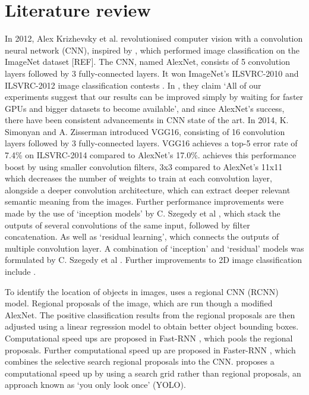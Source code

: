 \documentclass[11pt]{article}
\begin{document}
\section{Literature review}
In 2012, Alex Krizhevsky et al. revolutionised computer vision with a convolution neural network (CNN), inspired by \cite{Yann}, which performed image classification on the ImageNet dataset [REF]. The CNN, named AlexNet, consists of 5 convolution layers followed by 3 fully-connected layers. It won ImageNet's ILSVRC-2010 and ILSVRC-2012 image classification contests \cite{alex_net}. In \cite{alex_net}, they claim `All of our experiments suggest that our results can be improved simply by waiting for faster GPUs and bigger datasets to become available', and since AlexNet's success, there have been consistent advancements in CNN state of the art. In 2014, K. Simonyan and A. Zisserman introduced VGG16\cite{VGG16}, consisting of 16 convolution layers followed by 3 fully-connected layers. VGG16 achieves a top-5 error rate of 7.4\% on ILSVRC-2014 compared to AlexNet's 17.0\%. \cite{VGG16} achieves this performance boost by using smaller convolution filters, 3x3 compared to AlexNet's 11x11 which decreases the number of weights to train at each convolution layer, alongside a deeper convolution architecture, which can extract deeper relevant semantic meaning from the images. Further performance improvements were made by the use of `inception models' by C. Szegedy et al \cite{inception}\cite{inceptionV2}, which stack the outputs of several convolutions of the same input, followed by filter concatenation. As well as `residual learning'\cite{ResNet}, which connects the outputs of multiple convolution layer. A combination of `inception' and `residual' models was formulated by C. Szegedy et al \cite{Incep_ResNet}. Further improvements to 2D image classification include \cite{neural_search} \cite{scaleable_image}.

To identify the location of objects in images, \cite{RNN} uses a regional CNN (RCNN) model. Regional proposals of the image, which are run though a modified AlexNet. The positive classification results from the regional proposals are then adjusted using a linear regression model to obtain better object bounding boxes. Computational speed ups are proposed in Fast-RNN \cite{fast_RNN}, which pools the regional proposals. Further computational speed up are proposed in Faster-RNN \cite{faster_RNN}, which combines the selective search regional proposals into the CNN. \cite{YOLO} proposes a computational speed up by using a search grid rather than regional proposals, an approach known as `you only look once' (YOLO).
\end{document}
